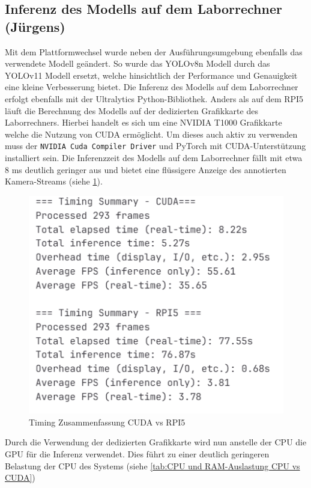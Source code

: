 \subsection{Inferenz des Modells auf dem Laborrechner (Jürgens)}
Mit dem Plattformwechsel wurde neben der Ausführungsumgebung ebenfalls das verwendete Modell geändert. So wurde das YOLOv8n Modell durch das YOLOv11 Modell ersetzt, welche hinsichtlich der Performance und Genauigkeit eine kleine Verbesserung bietet.
Die Inferenz des Modells auf dem Laborrechner erfolgt ebenfalls mit der Ultralytics Python-Bibliothek. Anders als auf dem RPI5 läuft die Berechnung des Modells auf der dedizierten Grafikkarte des Laborrechners. Hierbei handelt es sich um eine NVIDIA T1000 Grafikkarte welche die Nutzung von CUDA ermöglicht. Um dieses auch aktiv zu verwenden muss der \texttt{NVIDIA Cuda Compiler Driver} und PyTorch mit CUDA-Unterstützung installiert sein. Die Inferenzzeit des Modells auf dem Laborrechner fällt mit etwa 8 ms deutlich geringer aus und bietet eine flüssigere Anzeige des annotierten Kamera-Streams (siehe \ref{fig:Timing Zusammenfassung CUDA vs RPI5}). 
\begin{figure}[h]
  \centering
  \includegraphics[scale=0.5]{images/Timing_summary.png}
  \caption{Timing Zusammenfassung CUDA vs RPI5}
  \label{fig:Timing Zusammenfassung CUDA vs RPI5}
\end{figure}
\newpage

Durch die Verwendung der dedizierten Grafikkarte wird nun anstelle der CPU die GPU für die Inferenz verwendet. Dies führt zu einer deutlich geringeren Belastung der CPU des Systems (siehe \ref{tab:CPU und RAM-Auslastung CPU vs CUDA})

